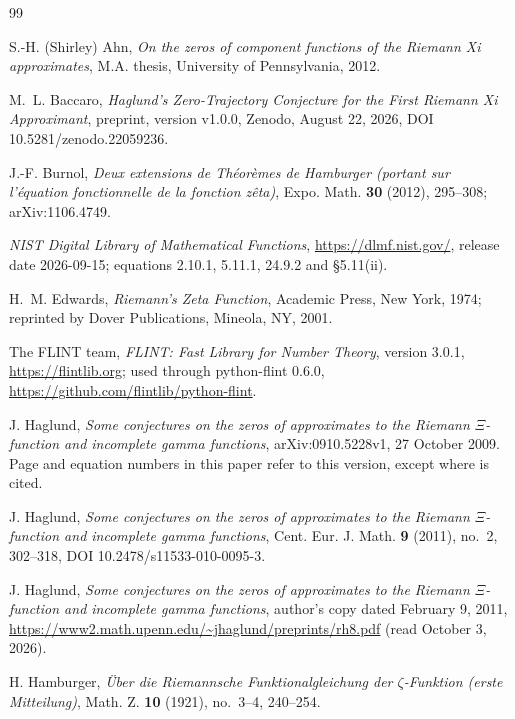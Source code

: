 \documentclass[11pt]{article}
\theoremstyle{plain}
\theoremstyle{definition}
\theoremstyle{remark}
\begin{document}
\begin{thebibliography}{99}

 S.-H. (Shirley) Ahn, \emph{On the zeros of component
functions of the Riemann Xi approximates}, M.A. thesis, University of
Pennsylvania, 2012.

 M.~L. Baccaro, \emph{Haglund's Zero-Trajectory Conjecture
for the First Riemann Xi Approximant}, preprint, version v1.0.0, Zenodo,
August 22, 2026, DOI 10.5281/zenodo.22059236.

 J.-F. Burnol, \emph{Deux extensions de Th\'eor\`emes de
Hamburger (portant sur l'\'equation fonctionnelle de la fonction z\^eta)},
Expo. Math. \textbf{30} (2012), 295--308; arXiv:1106.4749.

 \emph{NIST Digital Library of Mathematical Functions},
\url{https://dlmf.nist.gov/}, release date 2026-09-15; equations 2.10.1,
5.11.1, 24.9.2 and \S5.11(ii).

 H.~M. Edwards, \emph{Riemann's Zeta Function}, Academic
Press, New York, 1974; reprinted by Dover Publications, Mineola, NY, 2001.

 The FLINT team, \emph{FLINT: Fast Library for Number
Theory}, version 3.0.1, \url{https://flintlib.org}; used through python-flint
0.6.0, \url{https://github.com/flintlib/python-flint}.

 J. Haglund, \emph{Some conjectures on the zeros of
approximates to the Riemann $\Xi$-function and incomplete gamma functions},
arXiv:0910.5228v1, 27 October 2009. Page and equation numbers in this paper
refer to this version, except where \cite{HagW} is cited.

 J. Haglund, \emph{Some conjectures on the zeros of
approximates to the Riemann $\Xi$-function and incomplete gamma functions},
Cent. Eur. J. Math. \textbf{9} (2011), no.~2, 302--318,
DOI 10.2478/s11533-010-0095-3.

 J. Haglund, \emph{Some conjectures on the zeros of
approximates to the Riemann $\Xi$-function and incomplete gamma functions},
author's copy dated February 9, 2011,
\url{https://www2.math.upenn.edu/~jhaglund/preprints/rh8.pdf} (read October 3,
2026).

 H. Hamburger, \emph{\"Uber die Riemannsche
Funktionalgleichung der $\zeta$-Funktion (erste Mitteilung)}, Math. Z.
\textbf{10} (1921), no.~3--4, 240--254.


\end{thebibliography}
\end{document}

